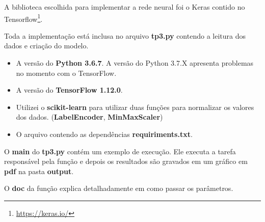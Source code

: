 A biblioteca escolhida para implementar a rede neural foi o Keras contido no Tensorflow\footnote{\url{https://keras.io/}}.

Toda a implementação está inclusa no arquivo \textbf{tp3.py} contendo a leitura dos dados e criação do modelo.

\begin{itemize}
    \item A versão do \textbf{Python 3.6.7}. A versão do Python 3.7.X apresenta problemas no momento com o TensorFlow.
    \item A versão do \textbf{TensorFlow 1.12.0}.
    \item Utilizei o \textbf{scikit-learn} para utilizar duas funções para normalizar os valores dos dados. (\textbf{LabelEncoder}, \textbf{MinMaxScaler})
    \item O arquivo contendo as dependências \textbf{requiriments.txt}.
\end{itemize}

O \textbf{main} do \textbf{tp3.py} contém um exemplo de execução. Ele executa a tarefa responsável pela função  e depois os resultados são gravados em um gráfico em \textbf{pdf} na pasta \textbf{output}.

O \textbf{doc} da função explica detalhadamente em como passar os parâmetros.

